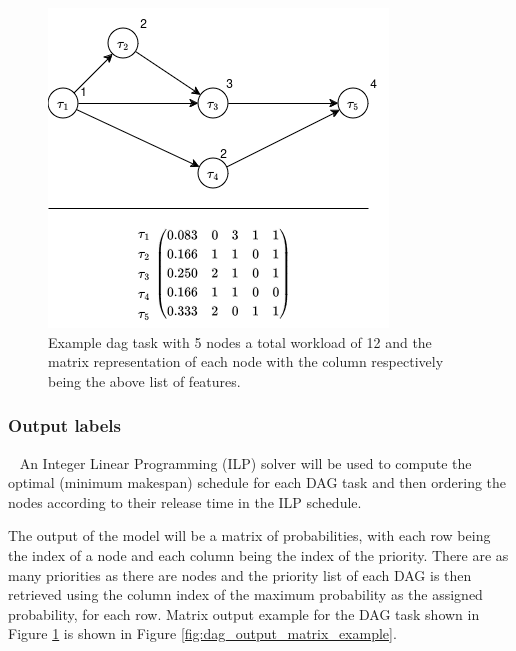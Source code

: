 \begin{figure}
    \centering
    \includegraphics[width=\linewidth]{images/dag_matrix_example.drawio.png}
    \caption{Example dag task with 5 nodes a total workload of 12
    and the matrix representation of each node with the column respectively being the above list of features.}
    \label{fig:dag_task_matrix_example}
\end{figure}

\subsubsection{Output labels}
~
\label{sec:output_labels}
An Integer Linear Programming (ILP) solver will be used to compute
the optimal (minimum makespan) schedule for each DAG task and then
ordering the nodes according to their release time in the ILP schedule.

The output of the model will be a matrix of probabilities,
with each row being the index of a node and each column being the index of the priority.
There are as many priorities as there are nodes and 
the priority list of each DAG is then retrieved using the column
index of the maximum probability as the assigned probability, for each row.
Matrix output example for the DAG task shown in Figure \ref{fig:dag_task_matrix_example}
is shown in Figure \ref{fig:dag_output_matrix_example}.

